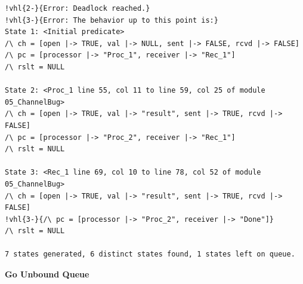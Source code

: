 \documentclass[
  11pt,aspectratio=1610,pdf,hyperref={unicode,colorlinks=false}
]{beamer}
\begin{document}
\begin{frame}[c,fragile]
  \begin{tcolorbox}[colback=shellbgcolor,boxrule=.25pt]%
  \centering\tiny%
  \begin{Verbatim}[commandchars=!\{\}]
!vhl{2-}{Error: Deadlock reached.}
!vhl{3-}{Error: The behavior up to this point is:}
State 1: <Initial predicate>
/\ ch = [open |-> TRUE, val |-> NULL, sent |-> FALSE, rcvd |-> FALSE]
/\ pc = [processor |-> "Proc_1", receiver |-> "Rec_1"]
/\ rslt = NULL

State 2: <Proc_1 line 55, col 11 to line 59, col 25 of module 05_ChannelBug>
/\ ch = [open |-> TRUE, val |-> "result", sent |-> TRUE, rcvd |-> FALSE]
/\ pc = [processor |-> "Proc_2", receiver |-> "Rec_1"]
/\ rslt = NULL

State 3: <Rec_1 line 69, col 10 to line 78, col 52 of module 05_ChannelBug>
/\ ch = [open |-> TRUE, val |-> "result", sent |-> TRUE, rcvd |-> FALSE]
!vhl{3-}{/\ pc = [processor |-> "Proc_2", receiver |-> "Done"]}
/\ rslt = NULL

7 states generated, 6 distinct states found, 1 states left on queue.
  \end{Verbatim}
\end{tcolorbox}
\end{frame}

\begin{frame}[t,fragile]
  \begin{minipage}{\textwidth}
      \centering%
      {\Large\bf Go Unbound Queue\\}~%
  \end{minipage}\\[2ex]%
  \begin{minipage}{\textwidth}
    \begin{columns}[T]
      \begin{column}{.5\textwidth}
      \end{column}
      \begin{column}{.5\textwidth}
        \vspace{-1ex}%
      \end{column}
    \end{columns}
  \end{minipage}
\end{frame}
\end{document}
